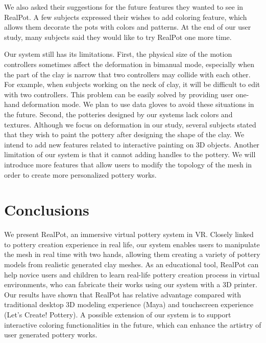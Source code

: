 \documentclass{svjour3}                     %
\begin{document}
We also asked their suggestions for the future features they wanted to see in RealPot.
A few subjects expressed their wishes to add coloring feature, which allows them decorate the pots with colors and patterns.
At the end of our user study, many subjects said they would like to try RealPot one more time.

Our system still has its limitations. First, the physical size of the motion controllers sometimes affect the deformation in bimanual mode, especially when the part of the clay is narrow that two controllers may collide with each other. For example, when subjects working on the neck of clay, it will be difficult to edit with two controllers. This problem can be easily solved by providing user one-hand deformation mode. We plan to use data gloves to avoid these situations in the future.
%
Second, the potteries designed by our systems lack colors and textures. Although we focus on deformation in our study, several subjects stated that they wish to paint the pottery after designing the shape of the clay. We intend to add new features related to interactive painting on 3D objects.
%
Another limitation of our system is that it cannot adding handles to the pottery. We will introduce more features that allow users to modify the topology of the mesh in order to create more personalized pottery works.
















\section{Conclusions}
\label{sec:conclusion}

We present RealPot, an immersive virtual pottery system in VR.
Closely linked to pottery creation experience in real life, our system enables users to manipulate the mesh in real time with two hands, allowing them creating a variety of pottery models from realistic generated clay meshes.
As an educational tool, RealPot can help novice users and children to learn real-life pottery creation process in virtual environments, who can fabricate their works using our system with a 3D printer.
Our results have shown that RealPot has relative advantage compared with traditional desktop 3D modeling experience (Maya) and touchscreen experience (Let's Create! Pottery).
A possible extension of our system is to support interactive coloring functionalities in the future, which can enhance the artistry of user generated pottery works.
\end{document}
